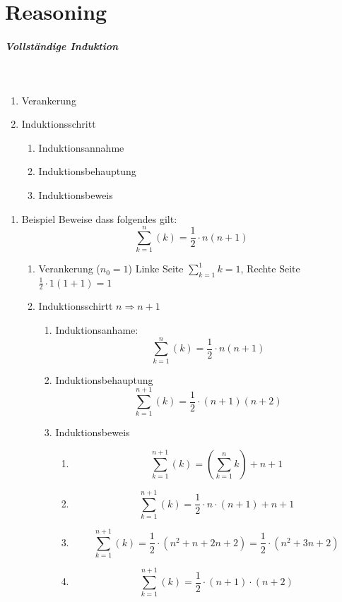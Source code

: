 \documentclass[11pt,twoside,landscape]{article}
\begin{document}
\section{Reasoning}
\label{sec:org6c47a40}
\subparagraph{Vollständige Induktion} \
\label{sec:org3cfccca}
\begin{enumerate}
\item Verankerung
\item Induktionsschritt
\begin{enumerate}
\item Induktionsannahme
\item Induktionsbehauptung
\item Induktionsbeweis
\end{enumerate}
\end{enumerate}

\begin{enumerate}
\item Beispiel
\label{sec:orgf227eea}
Beweise dass folgendes gilt: $$\sum_{k=1}^n (k) = \frac{1}{2} \cdot n (n + 1)$$

\begin{enumerate}
\item Verankerung (\(n_0 = 1\))
Linke Seite \(\sum_{k=1}^1 k = 1\), Rechte Seite \(\frac{1}{2} \cdot 1 (1 + 1) = 1\)

\item Induktionsschirtt \(n \Rightarrow n + 1\)
\begin{enumerate}
\item Induktionsanhame:
$$\sum_{k=1}^n (k) = \frac{1}{2} \cdot n (n + 1)$$
\item Induktionsbehauptung
$$\sum_{k=1}^{n+1} (k) = \frac{1}{2} \cdot (n+1) (n + 2)$$
\item Induktionsbeweis
\begin{enumerate}
\item $$\sum_{k=1}^{n+1} (k) = \left(\sum_{k=1}^n k\right) + n + 1$$
\item $$\sum_{k=1}^{n+1} (k) = \frac{1}{2} \cdot n \cdot (n + 1) + n + 1$$
\item $$\sum_{k=1}^{n+1} (k) = \frac{1}{2} \cdot (n^2 + n + 2n +2) = \frac{1}{2} \cdot (n^2 + 3n + 2)$$
\item $$\sum_{k=1}^{n+1} (k) = \frac{1}{2} \cdot (n + 1) \cdot (n+2)$$
\end{enumerate}
\end{enumerate}
\end{enumerate}
\end{enumerate}
\end{document}
